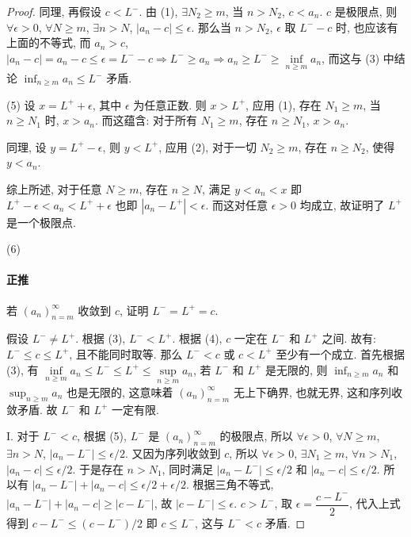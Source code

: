 \documentclass[UTF8]{ctexart}
\theoremstyle{mystyle}
\theoremstyle{myremark}
\theoremstyle{plain}
\begin{document}
\begin{proof}
    同理, 再假设 $ c < L^- $. 由 (1), $ \exists N_2 \geqslant m $, 当 $ n > N_2 $, $ c < a_n $. $ c $ 是极限点, 则 $ \forall \epsilon > 0 $, $ \forall N \geqslant m $, $ \exists n > N $, $ |a_n - c| \leqslant \epsilon $. 那么当 $ n > N_2 $, $ \epsilon $ 取 $ L^- - c $ 时, 也应该有上面的不等式, 而 $ a_n > c $, $ |a_n - c| = a_n - c \leqslant \epsilon = L^- - c \Longrightarrow L^- \geqslant a_n \Longrightarrow a_n \geqslant L^- \geqslant \inf\limits_{n \geqslant m} a_n $, 而这与 (3) 中结论 $ \displaystyle \inf_{n \geqslant m} a_n \leqslant L^- $ 矛盾. 

    (5) 设 $ x = L^+ + \epsilon $, 其中 $ \epsilon $ 为任意正数. 则 $ x > L^+ $, 应用 (1), 存在 $ N_1 \geqslant m $, 当 $ n \geqslant N_1 $ 时, $ x > a_n $. 而这蕴含: 对于所有 $ N_1 \geqslant m $, 存在 $ n \geqslant N_1 $, $ x > a_n $. 
    
    同理, 设 $ y = L^+ - \epsilon $, 则 $ y < L^+ $, 应用 (2), 对于一切 $ N_2 \geqslant m $, 存在 $ n \geqslant N_2 $, 使得 $ y < a_n $. 
    
    综上所述, 对于任意 $ N \geqslant m $, 存在 $ n \geqslant N $, 满足 $ y < a_n < x $ 即 $ L^+ - \epsilon < a_n < L^+ + \epsilon $ 也即 $ |a_n - L^+| < \epsilon $. 而这对任意 $ \epsilon > 0 $ 均成立, 故证明了 $ L^+ $ 是一个极限点.

    (6) \paragraph{正推} 若 $ (a_n)_{n = m}^\infty $ 收敛到 $ c $, 证明 $ L^- = L^+ = c $. 
    
    假设 $ L^- \neq L^+ $. 根据 (3), $ L^- < L^+ $. 根据 (4), $ c $ 一定在 $ L^- $ 和 $ L^+ $ 之间. 故有: $ L^- \leqslant c \leqslant L^+ $, 且不能同时取等. 那么 $ L^- < c $ 或 $ c < L^+ $ 至少有一个成立. 首先根据 (3), 有 $ \inf\limits_{n \geqslant m} a_n \leqslant L^- \leqslant L^+ \leqslant \sup\limits_{n \geqslant m} a_n $, 若 $ L^- $ 和 $ L^+ $ 是无限的, 则 $ \displaystyle \inf_{n \geqslant m} a_n $ 和 $ \displaystyle \sup_{n \geqslant m} a_n $ 也是无限的, 这意味着 $ (a_n)_{n = m}^\infty $ 无上下确界, 也就无界, 这和序列收敛矛盾. 故 $ L^- $ 和 $ L^+ $ 一定有限. 

    I. 对于 $ L^- < c $, 根据 (5), $ L^- $ 是 $ (a_n)_{n = m}^\infty $ 的极限点, 所以 $ \forall \epsilon > 0 $, $ \forall N \geqslant m $, $ \exists n > N $, $ |a_n - L^-| \leqslant \epsilon / 2 $. 又因为序列收敛到 $ c $, 所以 $ \forall \epsilon > 0 $, $ \exists N_1 \geqslant m $, $ \forall n > N_1 $, $ |a_n - c| \leqslant \epsilon / 2 $. 于是存在 $ n > N_1 $, 同时满足 $ |a_n - L^-| \leqslant \epsilon / 2 $ 和 $ |a_n - c| \leqslant \epsilon / 2 $. 所以有 $ |a_n - L^-| + |a_n - c| \leqslant \epsilon / 2 + \epsilon / 2 $. 根据三角不等式, $ |a_n - L^-| + |a_n - c| \geqslant |c - L^-| $, 故 $ |c - L^-| \leqslant \epsilon $. $ c > L^- $, 取 $ \epsilon = \dfrac{c - L^-}{2} $, 代入上式得到 $ c - L^- \leqslant (c - L^-)/2 $ 即 $ c \leqslant L^- $, 这与 $ L^- < c $ 矛盾.


\end{proof}
\end{document}

